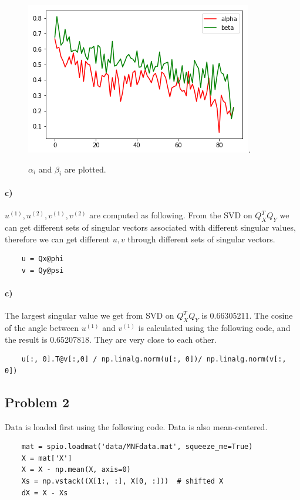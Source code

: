 \documentclass{article}
\begin{document}
\begin{figure}[h!]
\centering
\includegraphics[width=0.6\linewidth]{../images/1b.png}.
\caption{$\alpha_i$ and $\beta_i$ are plotted.}
\label{fig:alpha_i_beta_i}
\end{figure}

\paragraph{c)} $u^{(1)}, u^{(2)}, v^{(1)}, v^{(2)}$ are computed as following. From the SVD on $Q_X^T Q_Y$ we can get different sets of singular vectors associated with different singular values, therefore we can get different $u, v$ through different sets of singular vectors. 
\begin{lstlisting}
	u = Qx@phi
	v = Qy@psi
\end{lstlisting}

\paragraph{c)} The largest singular value we get from SVD on $Q_X^T Q_Y$ is 0.66305211. The cosine of the angle between $u^{(1)}$ and $v^{(1)}$ is calculated using the following code, and the result is 0.65207818. They are very close to each other.
\begin{lstlisting}
	u[:, 0].T@v[:,0] / np.linalg.norm(u[:, 0])/ np.linalg.norm(v[:, 0])
\end{lstlisting}

\subsection*{Problem 2}
Data is loaded first using the following code. Data is also mean-centered. 
\begin{lstlisting}
	mat = spio.loadmat('data/MNFdata.mat', squeeze_me=True)
	X = mat['X']
	X = X - np.mean(X, axis=0)
	Xs = np.vstack((X[1:, :], X[0, :]))  # shifted X
	dX = X - Xs
\end{lstlisting}
\end{document}

